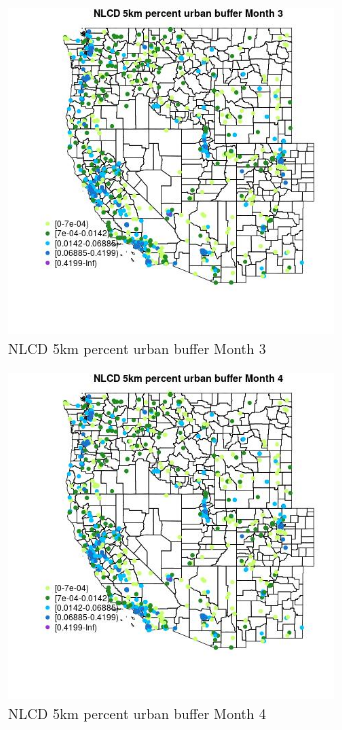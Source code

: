 \begin{figure} 
\centering  
\includegraphics[width=0.77\textwidth]{Code_Outputs/Report_ML_input_PM25_Step4_part_f_de_duplicated_aves_prioritize_24hr_obswNAs_MapObsMo3NLCD_5km_percent_urban_buffer.jpg} 
\caption{\label{fig:Report_ML_input_PM25_Step4_part_f_de_duplicated_aves_prioritize_24hr_obswNAsMapObsMo3NLCD_5km_percent_urban_buffer}NLCD 5km percent urban buffer Month 3} 
\end{figure} 
 

\begin{figure} 
\centering  
\includegraphics[width=0.77\textwidth]{Code_Outputs/Report_ML_input_PM25_Step4_part_f_de_duplicated_aves_prioritize_24hr_obswNAs_MapObsMo4NLCD_5km_percent_urban_buffer.jpg} 
\caption{\label{fig:Report_ML_input_PM25_Step4_part_f_de_duplicated_aves_prioritize_24hr_obswNAsMapObsMo4NLCD_5km_percent_urban_buffer}NLCD 5km percent urban buffer Month 4} 
\end{figure} 
 

